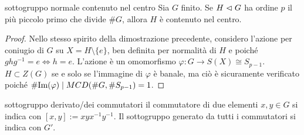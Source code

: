 \begin{proposition}{sottogruppo normale contenuto nel centro}
    Sia $G$ finito. Se $H \vartriangleleft G$ ha ordine $p$ il più piccolo primo che divide $\#G$, allora $H$ è contenuto nel centro.
\end{proposition}
\begin{proof}
    Nello stesso spirito della dimostrazione precedente, considero l'azione per coniugio di $G$ su $X = H \setminus \{ e \}$, ben definita per normalità di $H$ e poiché $ghg^{-1} = e \Leftrightarrow h = e$. L'azione è un omomorfismo $\varphi : G \to S(X) \cong S_{p-1}$. $H \subset Z(G)$ se e solo se l'immagine di $\varphi$ è banale, ma ciò è sicuramente verificato poiché $\#\text{Im}(\varphi) \mid MCD(\#G, \#S_{p-1}) = 1$.
\end{proof}
\begin{definition}{sottogruppo derivato/dei commutatori}
    il commutatore di due elementi $x,y \in G$ si indica con $[x,y]:= xyx^{-1}y^{-1}$. Il sottogruppo generato da tutti i commutatori si indica con $G'$. \\
\end{definition}
